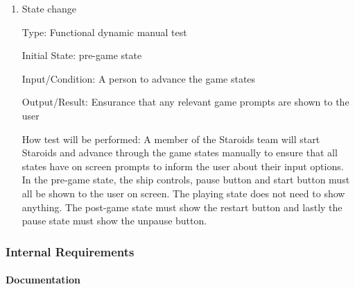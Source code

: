 \documentclass[12pt, titlepage]{article}
\begin{document}
\begin{enumerate}

\item{State change\\}

Type: Functional dynamic manual test

Initial State: pre-game state

Input/Condition: A person to advance the game states

Output/Result: Ensurance that any relevant game prompts are shown to the user

How test will be performed: A member of the Staroids team will start Staroids and advance through the game states manually to ensure that all states have on screen prompts to inform the user about their input options. In the pre-game state, the ship controls, pause button and start button must all be shown to the user on screen. The playing state does not need to show anything. The post-game state must show the restart button and lastly the pause state must show the unpause button.

\end{enumerate}

\subsubsection{Internal Requirements}

\paragraph{Documentation}
\end{document}
